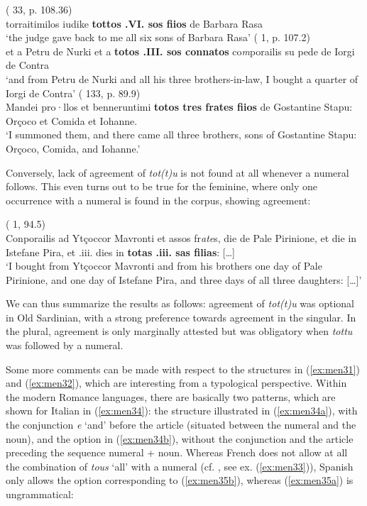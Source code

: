 \documentclass[output=paper,colorlinks,citecolor=brown]{langscibook}
\begin{document}
\ea\label{ex:men31}
\ea\label{ex:men31a}( 33, p. 108.36)\\
 torraitimilos iudike \textbf{tottos .VI. sos fiios} de Barbara Rasa\\
‘the judge gave back to me all six sons of Barbara Rasa’
\ex\label{ex:men31b}( 1, p. 107.2)\\
 et a Petru de Nurki et a \textbf{totos .III. sos connatos} co\textit{m}porailis su pede de Iorgi de Contra\\
‘and from Petru de Nurki and all his three brothers-in-law, I bought a quarter of Iorgi de Contra’
\ex\label{ex:men31c}( 133, p. 89.9)\\
 Mandei pro·llos et benneruntimi \textbf{totos tres frates fiios} de Gostantine Stapu: Orçoco et Comida et Iohanne.\\
‘I summoned them, and there came all three brothers, sons of Gostantine Stapu: Orçoco, Comida, and Iohanne.’
\z
\z

Conversely, lack of agreement of \textit{tot(t)u} is not found at all whenever a numeral follows. This even turns out to be true for the feminine, where only one occurrence with a numeral is found in the corpus, showing agreement:

\ea\label{ex:men32}( 1, 94.5)\\
Conporailis ad Ytçoccor Mavronti et assos fr\textit{ate}s, die de Pale Pirinione, et die in Istefane Pira, et .iii. dies in \textbf{totas .iii. sas filias}: […]\\
‘I bought from Ytçoccor Mavronti and from his brothers one day of Pale Pirinione, and one day of Istefane Pira, and three days of all three daughters: […]’ 
\z

We can thus summarize the results as follows: agreement of \textit{tot(t)u} was optional in Old Sardinian, with a strong preference towards agreement in the singular. In the plural, agreement is only marginally attested but was obligatory when \textit{tottu} was followed by a numeral.

Some more comments can be made with respect to the structures in (\ref{ex:men31}) and (\ref{ex:men32}), which are interesting from a typological perspective. Within the modern Romance languages, there are basically two patterns, which are shown for Italian in (\ref{ex:men34}): the structure illustrated in (\ref{ex:men34a}), with the conjunction \textit{e} ‘and’ before the article (situated between the numeral and the noun), and the option in (\ref{ex:men34b}), without the conjunction and the article preceding the sequence numeral + noun. Whereas French does not allow at all the combination of \textit{tous} ‘all’ with a numeral (cf. \cite[][210]{Doetjes1997}, see ex. (\ref{ex:men33})), Spanish only allows the option corresponding to (\ref{ex:men35b}), whereas (\ref{ex:men35a}) is ungrammatical:
\end{document}
